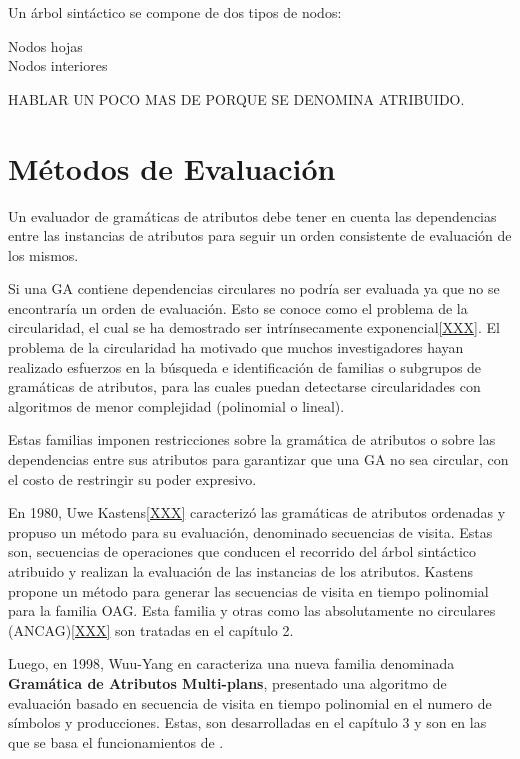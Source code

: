 Un árbol sintáctico se compone de dos tipos de nodos:
\begin{description}
\item [Nodos hojas]
\item [Nodos interiores]
\end{description}

HABLAR UN POCO MAS DE PORQUE SE DENOMINA ATRIBUIDO.


\section{Métodos de Evaluación}

Un evaluador de gramáticas de atributos debe tener en cuenta las dependencias entre las instancias de atributos para seguir un orden consistente de evaluación de los mismos.

Si una GA contiene dependencias circulares no podría ser evaluada ya que no se encontraría un orden de evaluación. Esto se conoce como el problema de la circularidad, el cual se ha demostrado ser intrínsecamente exponencial\ref{XXX}. El problema de la circularidad ha motivado que muchos investigadores hayan realizado esfuerzos en la búsqueda e identificación de familias o subgrupos de gramáticas de atributos, para las cuales puedan detectarse circularidades con algoritmos de menor complejidad (polinomial o lineal).

Estas familias imponen restricciones sobre la gramática de atributos o sobre las dependencias entre sus atributos para garantizar que una GA no sea circular, con el costo de restringir su poder expresivo.

En 1980, Uwe Kastens\ref{XXX} caracterizó las gramáticas de atributos ordenadas y propuso un método para su evaluación, denominado secuencias de visita. Estas son, secuencias de operaciones que conducen el recorrido del árbol sintáctico atribuido y realizan la evaluación de las instancias de los atributos. Kastens propone un método para generar las secuencias de visita en tiempo polinomial para la familia OAG. Esta familia y otras como las absolutamente no circulares (ANCAG)\ref{XXX} son tratadas en el capítulo 2.

Luego, en 1998, Wuu-Yang en \cite{wuu-yang1} caracteriza una nueva familia denominada \textbf{Gramática de Atributos Multi-plans}, presentado una algoritmo de evaluación basado en secuencia de visita en tiempo polinomial en el numero de símbolos y producciones. Estas, son desarrolladas en el capítulo 3 y son en las que se basa el funcionamientos de \maggen.  

